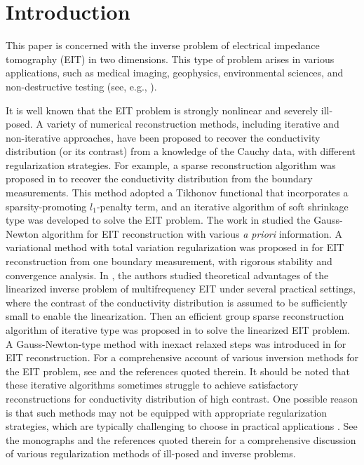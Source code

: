 \documentclass[11pt]{article}
\begin{document}
\section{Introduction}
\setcounter{equation}{0}
This paper is concerned with the inverse problem of electrical impedance tomography (EIT) in two dimensions.
This type of problem arises in various applications, such as medical imaging, geophysics, environmental sciences, and non-destructive testing (see, e.g., \cite{CMI99, BL02, AAG15}).

It is well known that the EIT problem is strongly nonlinear and severely ill-posed.
A variety of numerical reconstruction methods, including iterative and non-iterative approaches, have been proposed to recover the conductivity distribution (or its contrast) from a knowledge of the Cauchy data, with different regularization strategies.
For example, a sparse reconstruction algorithm was proposed in \cite{JBK12} to recover the conductivity distribution from the boundary measurements. 
This method adopted a Tikhonov functional that incorporates a sparsity-promoting $ l_1 $-penalty term, and an iterative algorithm of soft shrinkage type was developed to solve the EIT problem.
The work in \cite{IMR14} studied the Gauss-Newton algorithm for EIT reconstruction with various \textit{a priori} information.
A variational method with total variation regularization was proposed in \cite{HMK18} for EIT reconstruction from one boundary measurement, with rigorous stability and convergence analysis.
In \cite{AGS16}, the authors studied theoretical advantages of the linearized inverse problem of multifrequency EIT under several practical settings, where the contrast of the conductivity distribution is assumed to be sufficiently small to enable the linearization.
Then an efficient group sparse reconstruction algorithm of iterative type was proposed in \cite{AGS16} to solve the linearized EIT problem.
A Gauss-Newton-type method with inexact relaxed steps was introduced in \cite{JJK20} for EIT reconstruction.
For a comprehensive account of various inversion methods for the EIT problem, see \cite{CMI99, BL02, AAG15, IKJ15} and the references quoted therein.
It should be noted that these iterative algorithms sometimes struggle to achieve satisfactory reconstructions for conductivity distribution of high contrast.
One possible reason is that such methods may not be equipped with appropriate regularization strategies, which are typically challenging to choose in practical applications \cite{BL02, ASM19}.
See the monographs \cite{EHW96, KBN08} and the references quoted therein for a comprehensive discussion of various regularization methods of ill-posed and inverse problems.
\end{document}
